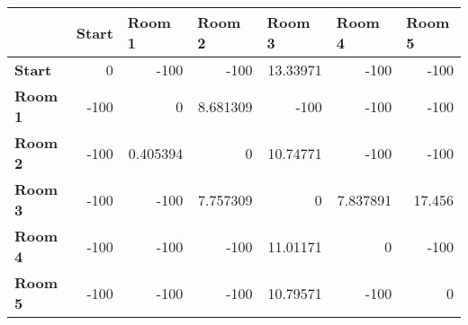 \documentclass[../Head/Main.tex]{subfiles}
\begin{document}
\begin{tabular}{|l|r|r|r|r|r|r|}
	\hline
     & \multicolumn{1}{l|}{\textbf{Start}} & \multicolumn{1}{l|}{\textbf{Room 1}} & \multicolumn{1}{l|}{\textbf{Room 2}} & \multicolumn{1}{l|}{\textbf{Room 3}} & \multicolumn{1}{l|}{\textbf{Room 4}} & \multicolumn{1}{l|}{\textbf{Room 5}} \\ \hline
\textbf{Start}  & 0                                   & {\color{red} -100}          & {\color{red} -100}          & 13.33971                             & {\color{red} -100}          & {\color{red} -100}          \\ \hline
\textbf{Room 1} & {\color{red} -100}         & 0                                    & 8.681309                             & {\color{red} -100}          & {\color{red} -100}          & {\color{red} -100}          \\ \hline
\textbf{Room 2} & {\color{red} -100}         & 0.405394                             & 0                                    & 10.74771                             & {\color{red} -100}          & {\color{red} -100}          \\ \hline
\textbf{Room 3} & {\color{red} -100}         & {\color{red} -100}          & 7.757309                             & 0                                    & 7.837891                             & 17.456                               \\ \hline
\textbf{Room 4} & {\color{red} -100}         & {\color{red} -100}          & {\color{red} -100}          & 11.01171                             & 0                                    & {\color{red} -100}          \\ \hline
\textbf{Room 5} & {\color{red} -100}         & {\color{red} -100}          & {\color{red} -100}          & 10.79571                             & {\color{red} -100}          & 0                                    \\ \hline
	\end{tabular}
\end{document}
